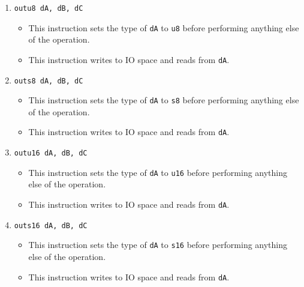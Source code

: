 \documentclass{article}
\begin{document}
\begin{itemize}
\begin{enumerate}
			\item \texttt{outu8 dA, dB, dC}
				\begin{itemize}
				\item This instruction sets the type of \texttt{dA} to
					\texttt{u8} before performing anything else of the
					operation.
				\item This instruction writes to IO space and reads from
					\texttt{dA}.
				\end{itemize}
			\item \texttt{outs8 dA, dB, dC}
				\begin{itemize}
				\item This instruction sets the type of \texttt{dA} to
					\texttt{s8} before performing anything else of the
					operation.
				\item This instruction writes to IO space and reads from
					\texttt{dA}.
				\end{itemize}
			\item \texttt{outu16 dA, dB, dC}
				\begin{itemize}
				\item This instruction sets the type of \texttt{dA} to
					\texttt{u16} before performing anything else of the
					operation.
				\item This instruction writes to IO space and reads from
					\texttt{dA}.
				\end{itemize}
			\item \texttt{outs16 dA, dB, dC}
				\begin{itemize}
				\item This instruction sets the type of \texttt{dA} to
					\texttt{s16} before performing anything else of the
					operation.
				\item This instruction writes to IO space and reads from
					\texttt{dA}.
				\end{itemize}


\end{enumerate}
\end{itemize}
\end{document}
